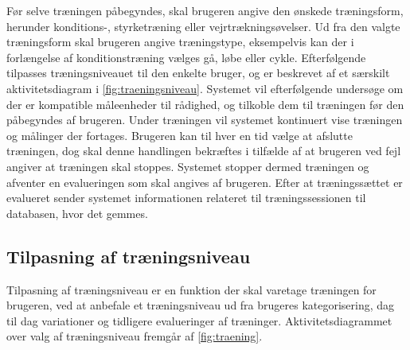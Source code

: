 \noindent
Før selve træningen påbegyndes, skal brugeren angive den ønskede træningsform, herunder konditions-, styrketræning eller vejrtrækningsøvelser. Ud fra den valgte træningsform skal brugeren angive træningstype, eksempelvis kan der i forlængelse af konditionstræning vælges gå, løbe eller cykle. 
Efterfølgende tilpasses træningsniveauet til den enkelte bruger, og er beskrevet af et særskilt aktivitetsdiagram i \autoref{fig:traeningsniveau}.
Systemet vil efterfølgende undersøge om der er kompatible måleenheder til rådighed, og tilkoble dem til træningen før den påbegyndes af brugeren. 
Under træningen vil systemet kontinuert vise træningen og målinger der fortages. Brugeren kan til hver en tid vælge at afslutte træningen, dog skal denne handlingen bekræftes i tilfælde af at brugeren ved fejl angiver at træningen skal stoppes. 
Systemet stopper dermed træningen og afventer en evalueringen som skal angives af brugeren. 
Efter at træningssættet er evalueret sender systemet informationen relateret til træningssessionen til databasen, hvor det gemmes.  

\subsection*{Tilpasning af træningsniveau} \label{sec:traeningsniveau}
Tilpasning af træningsniveau er en funktion der skal varetage træningen for brugeren, ved at anbefale et træningsniveau ud fra brugeres kategorisering, dag til dag variationer og tidligere evalueringer af træninger. Aktivitetsdiagrammet over valg af træningsniveau fremgår af \autoref{fig:traening}.
 
